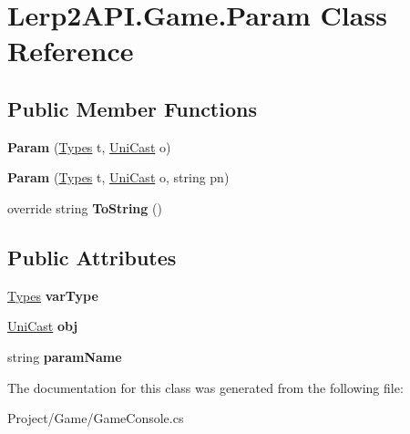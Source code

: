 \hypertarget{class_lerp2_a_p_i_1_1_game_1_1_param}{}\section{Lerp2\+A\+P\+I.\+Game.\+Param Class Reference}
\label{class_lerp2_a_p_i_1_1_game_1_1_param}
\subsection*{Public Member Functions}
\begin{DoxyCompactItemize}
\item 
\mbox{\label{class_lerp2_a_p_i_1_1_game_1_1_param_adc3bb5d52ed368ba50e1975c68216c78}} 
{\bfseries Param} (\hyperlink{class_types}{Types} t, \hyperlink{class_lerp2_a_p_i_1_1_game_1_1_uni_cast}{Uni\+Cast} o)
\item 
\mbox{\label{class_lerp2_a_p_i_1_1_game_1_1_param_a4c351ce6453de13c541802f70a50bd79}} 
{\bfseries Param} (\hyperlink{class_types}{Types} t, \hyperlink{class_lerp2_a_p_i_1_1_game_1_1_uni_cast}{Uni\+Cast} o, string pn)
\item 
\mbox{\label{class_lerp2_a_p_i_1_1_game_1_1_param_a6755d351e68f0743c4118e341a443f78}} 
override string {\bfseries To\+String} ()
\end{DoxyCompactItemize}
\subsection*{Public Attributes}
\begin{DoxyCompactItemize}
\item 
\mbox{\label{class_lerp2_a_p_i_1_1_game_1_1_param_a44e4fd6a863695d5e967f8132a8a9d33}} 
\hyperlink{class_types}{Types} {\bfseries var\+Type}
\item 
\mbox{\label{class_lerp2_a_p_i_1_1_game_1_1_param_a1574efce7c2c1d3b834d95a55dc99185}} 
\hyperlink{class_lerp2_a_p_i_1_1_game_1_1_uni_cast}{Uni\+Cast} {\bfseries obj}
\item 
\mbox{\label{class_lerp2_a_p_i_1_1_game_1_1_param_ae34f6415c4b58bfc604466c2250ba05c}} 
string {\bfseries param\+Name}
\end{DoxyCompactItemize}


The documentation for this class was generated from the following file\+:\begin{DoxyCompactItemize}
\item 
Project/\+Game/Game\+Console.\+cs\end{DoxyCompactItemize}
